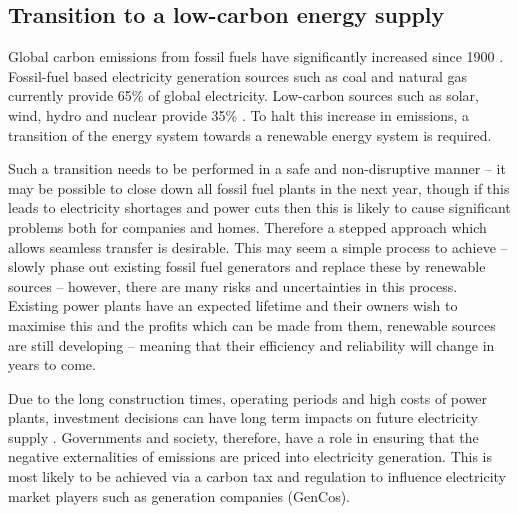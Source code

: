\subsection{Transition to a low-carbon energy supply}

Global carbon emissions from fossil fuels have significantly increased since 1900 \cite{boden2017global}.    Fossil-fuel based electricity generation sources such as coal and natural gas currently provide 65\% of global electricity. Low-carbon sources such as solar, wind, hydro and nuclear provide 35\% \cite{BP2018}. To halt this increase in  emissions, a transition of the energy system towards a renewable energy system is required. 





Such a transition needs to be performed in a safe and non-disruptive manner -- it may be possible to close down all fossil fuel plants in the next year, though if this leads to electricity shortages and power cuts then this is likely to cause significant problems both for companies and homes. Therefore a stepped approach which allows seamless transfer is desirable. This may seem a simple process to achieve -- slowly phase out existing fossil fuel generators and replace these by renewable sources -- however, there are many risks and uncertainties in this process. Existing power plants have an expected lifetime and their owners wish to maximise this and the profits which can be made from them, renewable sources are still developing -- meaning that their efficiency and reliability will change in years to come.

Due to the long construction times, operating periods and high costs of power plants, investment decisions can have long term impacts on future electricity supply \cite{Chappin2017}. Governments and society, therefore, have a role in ensuring that the negative externalities of emissions are priced into electricity generation. This is most likely to be achieved via a carbon tax and regulation to influence electricity market players such as generation companies (GenCos).


